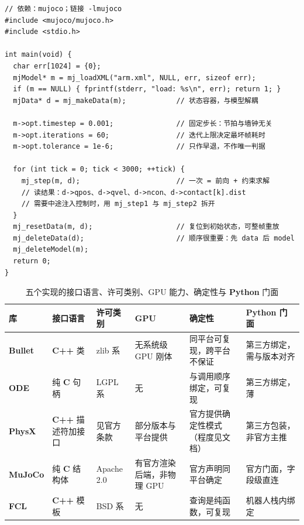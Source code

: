 \documentclass[12pt,a4paper,fontset=fandol]{ctexbook}
\newcommand{\Lib}[1]{\textbf{#1}}
\newcommand{\Lang}[1]{\textsf{\bfseries #1}}
\newcommand{\CL}{\Lang{C}}
\newcommand{\CPP}{\Lang{C++}}
\newcommand{\PY}{\Lang{Python}}
\begin{document}
\begin{lstlisting}[style=cstyle,label={lst:ch10-mujoco},caption={MuJoCo 的 C API：模型与数据分离，固定步长显式推进}]
// 依赖：mujoco；链接 -lmujoco
#include <mujoco/mujoco.h>
#include <stdio.h>

int main(void) {
  char err[1024] = {0};
  mjModel* m = mj_loadXML("arm.xml", NULL, err, sizeof err);
  if (m == NULL) { fprintf(stderr, "load: %s\n", err); return 1; }
  mjData* d = mj_makeData(m);            // 状态容器，与模型解耦

  m->opt.timestep = 0.001;               // 固定步长：节拍与墙钟无关
  m->opt.iterations = 60;                // 迭代上限决定最坏帧耗时
  m->opt.tolerance = 1e-6;               // 只作早退，不作唯一判据

  for (int tick = 0; tick < 3000; ++tick) {
    mj_step(m, d);                       // 一次 = 前向 + 约束求解
    // 读结果：d->qpos、d->qvel、d->ncon、d->contact[k].dist
    // 需要中途注入控制时，用 mj_step1 与 mj_step2 拆开
  }
  mj_resetData(m, d);                    // 复位到初始状态，可整帧重放
  mj_deleteData(d);                      // 顺序很重要：先 data 后 model
  mj_deleteModel(m);
  return 0;
}
\end{lstlisting}

\begin{table}[H]
\centering
\caption{五个实现的接口语言、许可类别、GPU 能力、确定性与 \PY{} 门面}
\label{tab:ch10-libs}
\small
\begin{tabular}{@{}>{\raggedright\arraybackslash}p{}
  >{\raggedright\arraybackslash}p{}
  >{\raggedright\arraybackslash}p{}
  >{\raggedright\arraybackslash}p{}
  >{\raggedright\arraybackslash}p{}
  >{\raggedright\arraybackslash}p{}@{}}
\toprule
库 & 接口语言 & 许可类别 & GPU & 确定性 & \PY{} 门面 \\
\midrule
\Lib{Bullet} & \CPP{} 类 & zlib 系 & 无系统级 GPU 刚体 &
  同平台可复现，跨平台不保证 & 第三方绑定，需与版本对齐 \\
\Lib{ODE} & 纯 \CL{} 句柄 & LGPL 系 & 无 &
  与调用顺序绑定，可复现 & 第三方绑定，薄 \\
\Lib{PhysX} & \CPP{} 描述符加接口 & 见官方条款 &
  部分版本与平台提供 & 官方提供确定性模式（程度见文档） &
  第三方包装，非官方主推 \\
\Lib{MuJoCo} & 纯 \CL{} 结构体 & Apache 2.0 &
  有官方渲染后端，非物理 GPU & 官方声明同平台确定 &
  官方门面，字段级直连 \\
\Lib{FCL} & \CPP{} 模板 & BSD 系 & 无 &
  查询是纯函数，可复现 & 机器人栈内绑定 \\
\bottomrule
\end{tabular}
\end{table}
\end{document}
